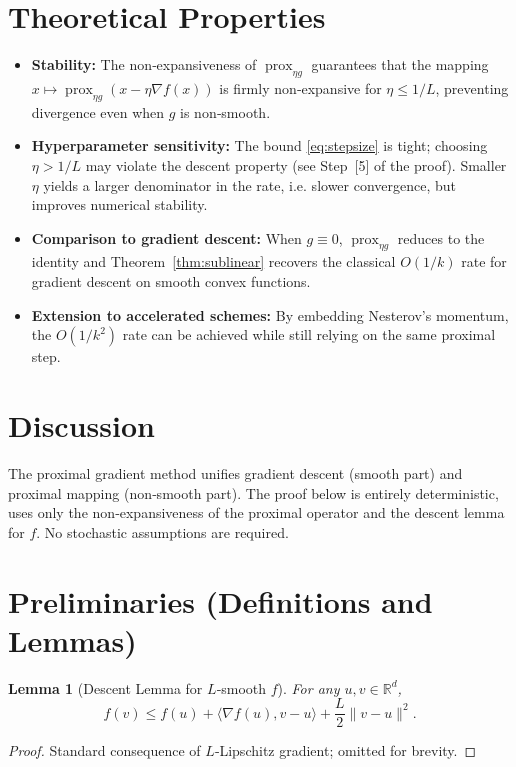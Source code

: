 \documentclass{article}
\newtheorem{lemma}{Lemma}
\newcommand{\prox}{\operatorname{prox}}
\newcommand{\R}{\mathbb{R}}
\begin{document}
\section*{Theoretical Properties}
\begin{itemize}
\item \textbf{Stability:} The non‑expansiveness of $\prox_{\eta g}$ guarantees that the mapping $x\mapsto \prox_{\eta g}(x-\eta\nabla f(x))$ is firmly non‑expansive for $\eta\le1/L$, preventing divergence even when $g$ is non‑smooth.
\item \textbf{Hyperparameter sensitivity:} The bound \eqref{eq:stepsize} is tight; choosing $\eta>1/L$ may violate the descent property (see Step~[5] of the proof). Smaller $\eta$ yields a larger denominator in the rate, i.e. slower convergence, but improves numerical stability.
\item \textbf{Comparison to gradient descent:} When $g\equiv0$, $\prox_{\eta g}$ reduces to the identity and Theorem~\ref{thm:sublinear} recovers the classical $O(1/k)$ rate for gradient descent on smooth convex functions.
\item \textbf{Extension to accelerated schemes:} By embedding Nesterov’s momentum, the $O(1/k^{2})$ rate can be achieved while still relying on the same proximal step.
\end{itemize}

\section*{Discussion}
The proximal gradient method unifies gradient descent (smooth part) and proximal mapping (non‑smooth part). The proof below is entirely deterministic, uses only the non‑expansiveness of the proximal operator and the descent lemma for $f$. No stochastic assumptions are required.

\newpage
\section*{Preliminaries (Definitions and Lemmas)}
\begin{lemma}[Descent Lemma for $L$‑smooth $f$]
\label{lem:descent}
For any $u,v\in\R^{d}$,
\[
f(v)\le f(u)+\langle\nabla f(u),v-u\rangle+\frac{L}{2}\|v-u\|^{2}.
\]
\end{lemma}
\begin{proof}
Standard consequence of $L$‑Lipschitz gradient; omitted for brevity. \qedhere
\end{proof}
\end{document}
